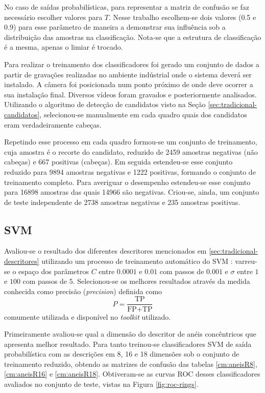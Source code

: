 No caso de saídas probabilísticas, para representar a matriz de confusão se faz necessário escolher valores para $T$. Nesse trabalho escolhem-se dois valores (0.5 e 0.9) para esse parâmetro de maneira a demonstrar sua influência sob a distribuição das amostras na classificação. Nota-se que a estrutura de classificação é a mesma, apenas o limiar é trocado.

Para realizar o treinamento dos classificadores foi gerado um conjunto de dados a partir de gravações realizadas no ambiente indústrial onde o sistema deverá ser instalado. A câmera foi posicionada num ponto próximo de onde deve ocorrer a sua instalação final. Diversos vídeos foram gravados e posteriormente analisados. Utilizando o algoritmo de detecção de candidatos visto na Seção \ref{sec:tradicional-candidatos}, selecionou-se manualmente em cada quadro quais dos candidatos eram verdadeiramente cabeças.

Repetindo esse processo em cada quadro formou-se um conjunto de treinamento, cuja amostra é o recorte do candidato, reduzido de 2459 amostras negativas (não cabeças) e 667 positivas (cabeças). Em seguida estendeu-se esse conjunto reduzido para 9894 amostras negativas e 1222 positivas, formando o conjunto de treinamento completo. Para averiguar o desempenho estendeu-se esse conjunto para 16898 amostras das quais 14966 são negativas. Criou-se, ainda, um conjunto de teste independente de 2738 amostras negativas e 235 amostras positivas.

\subsection{SVM}
Avaliou-se o resultado dos diferentes descritores mencionados em \ref{sec:tradicional-descritores} utilizando um processo de treinamento automático do SVM \cite{scikit-learn}: varreu-se o espaço dos parâmetros $C$ entre $0.0001$ e $0.01$ com passos de $0.001$ e $\sigma$ entre $1$ e $100$ com passos de $5$. Selecionou-se os melhores resultados através da medida conhecida como precisão (\textit{precision}) definida como
\begin{equation}
P = \frac{\text{TP}}{\text{FP}+\text{TP}}
\end{equation}
comumente utilizada e disponível no \textit{toolkit} utilizado.

Primeiramente avaliou-se qual a dimensão do descritor de anéis concêntricos que apresenta melhor resultado. Para tanto treinou-se classificadores SVM de saída probabilística com as descrições em 8, 16 e 18 dimensões sob o conjunto de treinamento reduzido, obtendo as matrizes de confusão das tabelas \ref{cm:aneisR8}, \ref{cm:aneisR16} e \ref{cm:aneisR18}. Obtiveram-se as curvas ROC desses classificadores avaliados no conjunto de teste, vistas na Figura \ref{fig:roc-rings}. 

